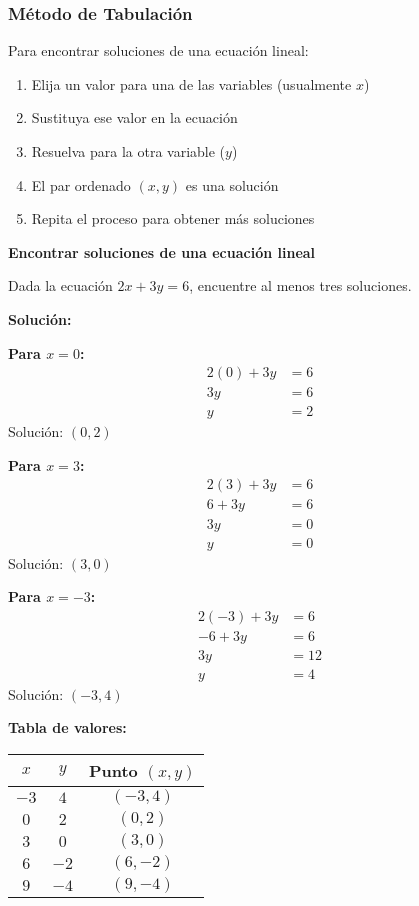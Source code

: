 \subsubsection*{Método de Tabulación}

Para encontrar soluciones de una ecuación lineal:
\begin{enumerate}
    \item Elija un valor para una de las variables (usualmente $x$)
    \item Sustituya ese valor en la ecuación
    \item Resuelva para la otra variable ($y$)
    \item El par ordenado $(x, y)$ es una solución
    \item Repita el proceso para obtener más soluciones
\end{enumerate}

\begin{example}
\textbf{Encontrar soluciones de una ecuación lineal}

Dada la ecuación $2x + 3y = 6$, encuentre al menos tres soluciones.

\textbf{Solución:}

\textbf{Para $x = 0$:}
\begin{align*}
2(0) + 3y &= 6 \\
3y &= 6 \\
y &= 2
\end{align*}
Solución: $(0, 2)$

\textbf{Para $x = 3$:}
\begin{align*}
2(3) + 3y &= 6 \\
6 + 3y &= 6 \\
3y &= 0 \\
y &= 0
\end{align*}
Solución: $(3, 0)$

\textbf{Para $x = -3$:}
\begin{align*}
2(-3) + 3y &= 6 \\
-6 + 3y &= 6 \\
3y &= 12 \\
y &= 4
\end{align*}
Solución: $(-3, 4)$

\textbf{Tabla de valores:}

\begin{center}
\begin{tabular}{|c|c|c|}
\hline
$x$ & $y$ & Punto $(x, y)$ \\
\hline
$-3$ & $4$ & $(-3, 4)$ \\
\hline
$0$ & $2$ & $(0, 2)$ \\
\hline
$3$ & $0$ & $(3, 0)$ \\
\hline
$6$ & $-2$ & $(6, -2)$ \\
\hline
$9$ & $-4$ & $(9, -4)$ \\
\hline
\end{tabular}
\end{center}
\end{example}

